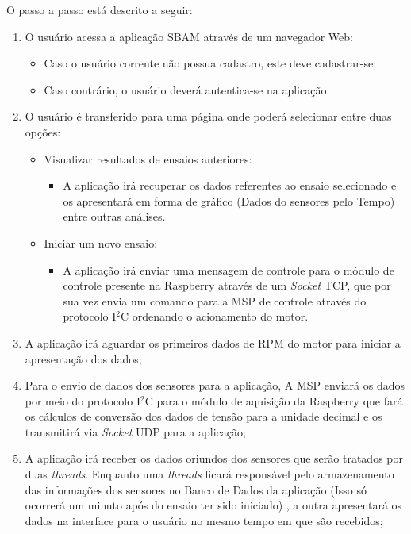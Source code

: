 O passo a passo está descrito a seguir:

\begin{enumerate}
	\item O usuário acessa a aplicação SBAM através de um navegador Web:
		\begin{itemize}
			\item Caso o usuário corrente não possua cadastro, este deve cadastrar-se;
			\item Caso contrário, o usuário deverá autentica-se na aplicação.
		\end{itemize}
	\item O usuário é transferido para uma página onde poderá selecionar entre duas opções:
		\begin{itemize}
			\item Visualizar resultados de ensaios anteriores:
				\begin{itemize}
					\item A aplicação irá recuperar os dados referentes ao ensaio selecionado e os apresentará em forma de gráfico (Dados do sensores pelo Tempo) entre outras análises.
				\end{itemize}
			\item Iniciar um novo ensaio:
			\begin{itemize}
				\item A aplicação irá enviar uma mensagem de controle para o módulo de controle presente na Raspberry através de um \textit{Socket} TCP, que por sua vez envia um comando para a MSP de controle através do protocolo I$^{2}$C ordenando o acionamento do motor.
			\end{itemize}
		\end{itemize}
	\item A aplicação irá aguardar os primeiros dados de RPM do motor para iniciar a apresentação dos dados;
	
	\item Para o envio de dados dos sensores para a aplicação, A MSP enviará os dados por meio do protocolo I$^{2}$C para o módulo de aquisição da Raspberry que fará os cálculos de conversão dos dados de tensão para a unidade decimal e os transmitirá via \textit{Socket} UDP para a aplicação;
	
	\item A aplicação irá receber os dados oriundos dos sensores que serão tratados por duas \textit{threads}. Enquanto uma \textit{threads} ficará responsável pelo armazenamento das informações dos sensores no Banco de Dados da aplicação (Isso só ocorrerá um minuto após do ensaio ter sido iniciado) , a outra apresentará os dados na interface para o usuário no mesmo tempo em que são recebidos;
	

\end{enumerate}
